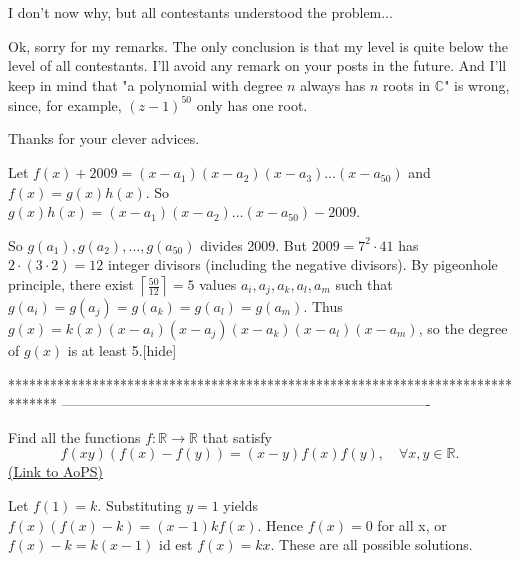 \begin{solution}
	\begin{tcolorbox} I don't now why, but all contestants understood the problem... \end{tcolorbox}

Ok, sorry for my remarks. The only conclusion is that my level is quite below the level of all contestants. I'll avoid any remark on your posts in the future. And I'll keep in mind that "a polynomial with degree $ n$ always has $ n$ roots in $ \mathbb C$" is wrong, since, for example, $ (z-1)^{50}$ only has one root. 

Thanks for your clever advices.
\end{solution}



\begin{solution}Let $ f(x)+2009=(x-a_1)(x-a_2)(x-a_3)\ldots(x-a_{50})$ and $ f(x)=g(x)h(x)$. So $ g(x)h(x)=(x-a_1)(x-a_2)\ldots(x-a_{50})-2009$.

So $ g(a_1),g(a_2),\ldots,g(a_{50})$ divides 2009. But $ 2009=7^2\cdot41$ has $ 2\cdot(3\cdot2)=12$ integer divisors (including the negative divisors). By pigeonhole principle, there exist $ \left\lceil\frac{50}{12}\right\rceil=5$ values $ a_i,a_j,a_k,a_l,a_m$ such that $ g(a_i)=g(a_j)=g(a_k)=g(a_l)=g(a_m)$. Thus $ g(x)=k(x)(x-a_i)(x-a_j)(x-a_k)(x-a_l)(x-a_m)$, so the degree of $ g(x)$ is at least 5.[\/hide]
\end{solution}
*******************************************************************************
-------------------------------------------------------------------------------

\begin{problem}
	Find all the functions $f: \mathbb R \to \mathbb R$ that satisfy \[ f(xy)(f(x) - f(y)) = (x - y)f(x)f(y) , \quad \forall x,y \in \mathbb R.\]
	\flushright \href{https://artofproblemsolving.com/community/c6h280764}{(Link to AoPS)}
\end{problem}



\begin{solution}
	Let $ f(1)=k$. Substituting $ y=1$ yields $ f(x)(f(x)-k)=(x-1)kf(x)$. Hence $ f(x)=0$ for all x, or $ f(x)-k=k(x-1)$ id est $ f(x)=kx$. These are all possible solutions.
\end{solution}



